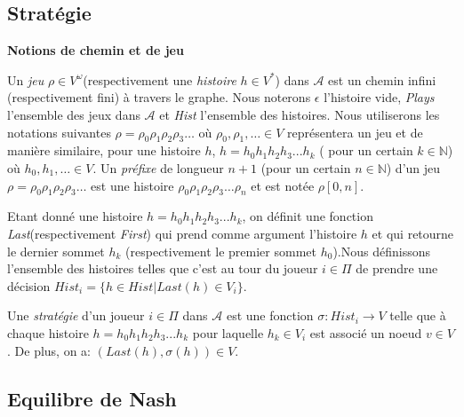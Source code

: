 \subsection{Stratégie}




\noindent\textbf{Notions de chemin et de jeu}


Un \textit{jeu} $\rho \in V^{\omega}$(respectivement une \textit{histoire} $h \in V^{*}$) dans $\mathscr{A}$ est un chemin infini (respectivement fini) à travers le graphe. Nous noterons $\epsilon$ l'histoire vide, \textit{Plays} l'ensemble des jeux dans $\mathscr{A}$ et \textit{Hist} l'ensemble des histoires. Nous utiliserons les notations suivantes $\rho = \rho _{0}  \rho _{1} \rho _{2}\rho _{3} \ldots$ où $\rho _{0},  \rho _{1},\ldots \in V$ représentera un jeu et de manière similaire, pour une histoire $h$, $ h = h_{0} h_{1} h_{2} h_{3} ... h_{k}$ ( pour un certain $k \in \mathbb{N}$) où  $h_{0}, h_{1}, \ldots \in V$.
Un \textit{préfixe} de longueur $n+1$ (pour un certain $n\in \mathbb{N}$) d'un jeu $\rho = \rho _{0}  \rho _{1} \rho _{2}\rho _{3} \ldots$ est une histoire $\rho _{0}  \rho _{1} \rho _{2}\rho _{3} \ldots \rho _{n}$ et est notée $\rho[0,n]$.

Etant donné une histoire $ h = h_{0} h_{1} h_{2} h_{3} ... h_{k}$,  on définit une fonction \textit{Last}(respectivement \textit{First}) qui prend comme argument l'histoire $h$ et qui retourne le dernier sommet $h_{k}$ (respectivement le premier sommet $h_{0}$).Nous définissons l'ensemble des histoires telles que c'est au tour du joueur $i \in \Pi$ de prendre une décision $Hist_{i} = \{ h \in Hist | Last(h) \in V_{i} \}$.

\begin{defi}[Stratégie]
	Une \textit{stratégie} d'un joueur $i \in \Pi$ dans $\mathscr{A}$ est une fonction $\sigma:Hist_{i} \rightarrow V$ telle que à chaque histoire $ h = h_{0} h_{1} h_{2} h_{3} ... h_{k}$ pour laquelle $h_{k} \in V_{i}$ est associé un noeud $v \in V$. De plus, on a: $(Last(h),\sigma(h))\in V$.
\end{defi}

\subsection{Equilibre de Nash}

